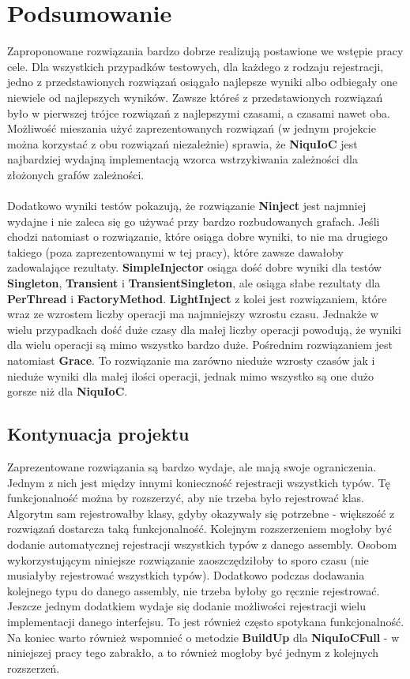 \documentclass[12pt]{article}
\begin{document}
\section{Podsumowanie}
Zaproponowane rozwiązania bardzo dobrze realizują postawione we wstępie pracy cele. Dla wszystkich przypadków testowych, dla każdego z rodzaju rejestracji, jedno z przedstawionych rozwiązań osiągało najlepsze wyniki albo odbiegały one niewiele od najlepszych wyników. Zawsze któreś z przedstawionych rozwiązań było w pierwszej trójce rozwiązań z najlepszymi czasami, a czasami nawet oba. Możliwość mieszania użyć zaprezentowanych rozwiązań (w jednym projekcie można korzystać z obu rozwiązań niezależnie) sprawia, że \textbf{NiquIoC} jest najbardziej wydajną implementacją wzorca wstrzykiwania zależności dla złożonych grafów zależności.\\ 
\\
Dodatkowo wyniki testów pokazują, że rozwiązanie \textbf{Ninject} jest najmniej wydajne i nie zaleca się go używać przy bardzo rozbudowanych grafach. Jeśli chodzi natomiast o rozwiązanie, które osiąga dobre wyniki, to nie ma drugiego takiego (poza zaprezentowanymi w tej pracy), które zawsze dawałoby zadowalające rezultaty. \textbf{SimpleInjector} osiąga dość dobre wyniki dla testów \textbf{Singleton}, \textbf{Transient} i \textbf{TransientSingleton}, ale osiąga słabe rezultaty dla \textbf{PerThread} i \textbf{FactoryMethod}. \textbf{LightInject} z kolei jest rozwiązaniem, które wraz ze wzrostem liczby operacji ma najmniejszy wzrostu czasu. Jednakże w wielu przypadkach dość duże czasy dla małej liczby operacji powodują, że wyniki dla wielu operacji są mimo wszystko bardzo duże. Pośrednim rozwiązaniem jest natomiast \textbf{Grace}. To rozwiązanie ma zarówno nieduże wzrosty czasów jak i nieduże wyniki dla małej ilości operacji, jednak mimo wszystko są one dużo gorsze niż dla \textbf{NiquIoC}.

\subsection{Kontynuacja projektu}
Zaprezentowane rozwiązania są bardzo wydaje, ale mają swoje ograniczenia. Jednym z nich jest między innymi konieczność rejestracji wszystkich typów. Tę funkcjonalność można by rozszerzyć, aby nie trzeba było rejestrować klas. Algorytm sam rejestrowałby klasy, gdyby okazywały się potrzebne - większość z rozwiązań dostarcza taką funkcjonalność. Kolejnym rozszerzeniem mogłoby być dodanie automatycznej rejestracji wszystkich typów z danego assembly. Osobom wykorzystującym niniejsze rozwiązanie zaoszczędziłoby to sporo czasu (nie musiałyby rejestrować wszystkich typów). Dodatkowo podczas dodawania kolejnego typu do danego assembly, nie trzeba byłoby go ręcznie  rejestrować. Jeszcze jednym dodatkiem wydaje się dodanie możliwości rejestracji wielu implementacji danego interfejsu. To jest również często spotykana funkcjonalność. Na koniec warto również wspomnieć o metodzie \textbf{BuildUp} dla \textbf{NiquIoCFull} - w niniejszej pracy tego zabrakło, a to również mogłoby być jednym z kolejnych rozszerzeń.
\end{document}
